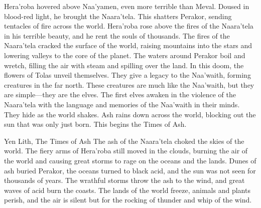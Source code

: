 \documentclass[smalldemyvopaper,11pt,twoside,onecolumn,openright,extrafontsizes]{memoir}
\begin{document}
Hera’roba hovered above Naa’yamen, even more terrible than Meval. Doused in blood-red light, he brought the Naara’tela. This shatters Perakor, sending tentacles of fire across the world. Hera’roba rose above the fires of the Naara’tela in his terrible beauty, and he rent the souls of thousands. The fires of the Naara’tela cracked the surface of the world, raising mountains into the stars and lowering valleys to the core of the planet. The waters around Perakor boil and wretch, filling the air with steam and spilling over the land. In this doom, the flowers of Tolas unveil themselves. They give a legacy to the Naa’waith, forming creatures in the far north. These creatures are much like the Naa’waith, but they are simple—they are the elves. The first elves awaken in the violence of the Naara’tela with the language and memories of the Naa’waith in their minds. They hide as the world shakes. Ash rains down across the world, blocking out the sun that was only just born. This begins the Times of Ash.

Yen Lith, The Times of Ash
The ash of the Naara’tela choked the skies of the world. The fiery arms of Hera’roba still moved in the clouds, burning the air of the world and causing great storms to rage on the oceans and the lands. Dunes of ash buried Perakor, the oceans turned to black acid, and the sun was not seen for thousands of years. The wrathful storms throw the ash to the wind, and great waves of acid burn the coasts. The lands of the world freeze, animals and plants perish, and the air is silent but for the rocking of thunder and whip of the wind.
\end{document}
